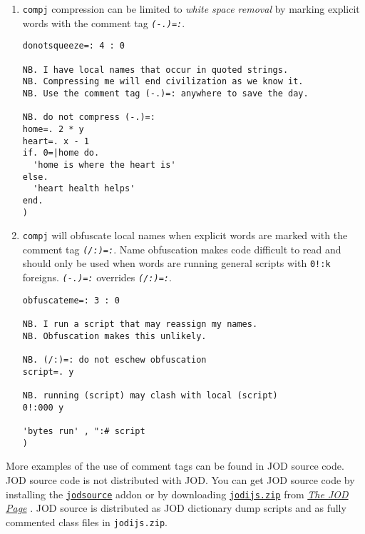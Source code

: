 \begin{enumerate}
\item
  \texttt{compj} compression can be limited to \emph{white space removal} by
  marking explicit words with the comment tag \textcolor{CodeComment}{\texttt{\textsl{(-.)=:}}}.

\begin{lstlisting}[frame=single,framerule=0pt]
donotsqueeze=: 4 : 0

NB. I have local names that occur in quoted strings.
NB. Compressing me will end civilization as we know it.
NB. Use the comment tag (-.)=: anywhere to save the day.

NB. do not compress (-.)=:
home=. 2 * y
heart=. x - 1
if. 0=|home do.
  'home is where the heart is'
else.
  'heart health helps'
end.
)
\end{lstlisting}

\item
\texttt{compj} will obfuscate local names when explicit words are marked with the comment tag
\textcolor{CodeComment}{\texttt{\textsl{(/:)=:}}}. Name obfuscation
makes code difficult to read and should only be used when words are running general scripts with 
\verb|0!:k| foreigns. 
\textcolor{CodeComment}{\texttt{\textsl{(-.)=:}}} overrides \textcolor{CodeComment}{\texttt{\textsl{(/:)=:}}}.

\begin{lstlisting}[frame=single,framerule=0pt]
obfuscateme=: 3 : 0

NB. I run a script that may reassign my names.
NB. Obfuscation makes this unlikely.

NB. (/:)=: do not eschew obfuscation
script=. y

NB. running (script) may clash with local (script)
0!:000 y

'bytes run' , ":# script
)
\end{lstlisting}

\end{enumerate}

    More examples of the use of comment tags can be found in 
      JOD source code.  JOD source code is not 
     distributed with JOD.  You can get JOD source code by installing
     the  \href{https://www.jsoftware.com/jwiki/Addons/general/jodsource}{\texttt{jodsource}}
     addon or by downloading \href{https://bakerjd99.wordpress.com/the-jod-page/}{\texttt{jodijs.zip}} from %
     \href{https://bakerjd99.wordpress.com/the-jod-page/}{\emph{The JOD Page}} \cite{baker:jodpages}.  
     JOD source is distributed as JOD dictionary dump scripts and as fully commented
	 class files in \texttt{jodijs.zip}.

